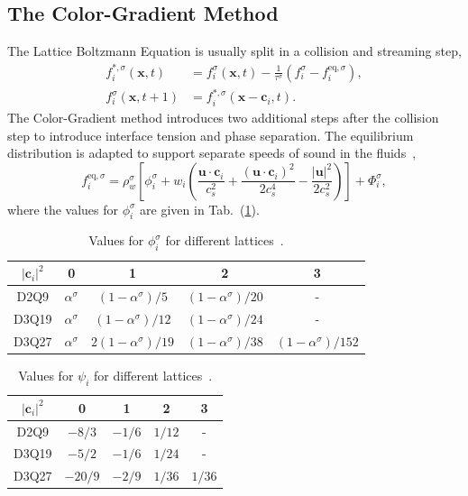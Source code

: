 \documentclass[aps,physrev,twocolumn,10pt]{revtex4-2}
\begin{document}
\subsection{\label{sec:The Color-Gradient Method}The Color-Gradient Method}
The Lattice Boltzmann Equation is usually split in a collision and streaming step,
\begin{equation}\label{eq:Collision and streaming color gradient}
\begin{split}
    f_i^{*,\sigma}(\bm{x}, t) &= f_i^{\sigma}(\bm{x}, t)- \frac{1}{\tau^\sigma}\left(f_i^{\sigma} - f_i^{\text{eq}, \sigma}\right),\\
    f_i^\sigma\left(\bm{x}, t+1\right) &= f_i^{*,\sigma}\left(\bm{x} - \bm{c}_i, t\right).
\end{split}
\end{equation}
The Color-Gradient method introduces two additional steps after the collision step to introduce interface tension and phase separation. The equilibrium distribution is adapted to support separate speeds of sound in the fluids~\cite{leclaire_generalized_2017},
\begin{equation}\label{eq:cgeq}
    f_i^{\text{eq}, \sigma} = \rho^\sigma_w \left[\phi_i^\sigma + w_i\left(\frac{\bm{u}\cdot \bm{c}_i}{c_s^2} + \frac{{\left(\bm{u}\cdot \bm{c}_i\right)}^2}{2c_s^4} - \frac{|\bm{u}|^2}{2c_s^2}\right)\right] + \Phi_i^\sigma,
\end{equation}
where the values for $\phi_i^\sigma$ are given in Tab.~(\ref{tab:phi}).
\begin{table}[htbp]
\centering
\begin{tabular}{| c | c c c c|} 
    \hline
    $|\bm{c}_i|^2$& 0 & 1 & 2 & 3 \\ 
    \hline
    D2Q9 & $\alpha^\sigma$ & $\left(1-\alpha^\sigma\right)/5$ & $\left(1-\alpha^\sigma\right)/20$ & -\\
    D3Q19 & $\alpha^\sigma$ & $\left(1-\alpha^\sigma\right)/12$ & $\left(1-\alpha^\sigma\right)/24$& - \\
    D3Q27 & $\alpha^\sigma$ & $2\left(1-\alpha^\sigma\right)/19$ & $\left(1-\alpha^\sigma\right)/38$ & $\left(1-\alpha^\sigma\right)/152$\\
    \hline
\end{tabular}
\caption{Values for $\phi_i^\sigma$ for different lattices~\cite{leclaire_generalized_2017}.}\label{tab:phi}
\end{table}
\begin{table}[htbp]
\centering
\begin{tabular}{| c | c c c c|} 
    \hline
    $|\bm{c}_i|^2$& 0 & 1 & 2 & 3 \\ 
    \hline
    D2Q9 & $-8/3$ & $-1/6$ & $1/12$ & -\\
    D3Q19 & $-5/2$ & $-1/6$ & $1/24$ & - \\
    D3Q27 & $-20/9$ & $-2/9$ & $1/36$ & $1/36$ \\
    \hline
\end{tabular}
\caption{Values for $\psi_i$ for different lattices~\cite{leclaire_generalized_2017}.}\label{tab:psi}
\end{table}
\end{document}
